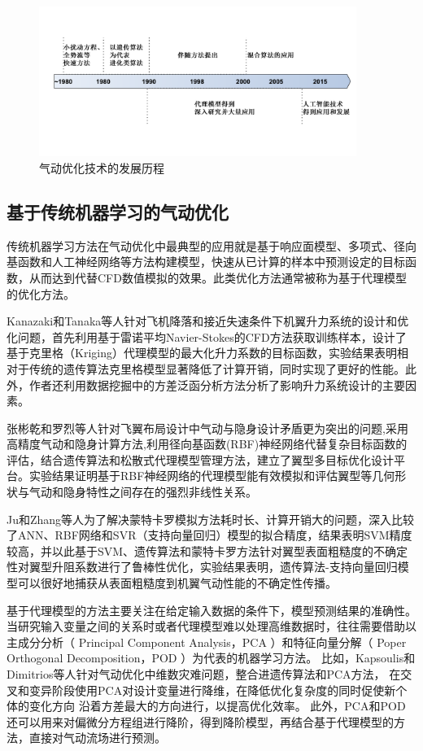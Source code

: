 \begin{figure}[htp]
	\centering
	\includegraphics[width=0.92\textwidth]{figures/develop.pdf}
	\caption{气动优化技术的发展历程}
	\label{fig:1}
\end{figure}

\subsection{基于传统机器学习的气动优化}
传统机器学习方法在气动优化中最典型的应用就是基于响应面模型、多项式、径向基函数和人工神经网络等方法构建模型，快速从已计算的样本中预测设定的目标函数，从而达到代替CFD数值模拟的效果。此类优化方法通常被称为基于代理模型的优化方法。

Kanazaki和Tanaka等人\cite{Kanazaki2007Multi}针对飞机降落和接近失速条件下机翼升力系统的设计和优化问题，首先利用基于雷诺平均Navier-Stokes的CFD方法获取训练样本，设计了基于克里格（Kriging）代理模型的最大化升力系数的目标函数，实验结果表明相对于传统的遗传算法克里格模型显著降低了计算开销，同时实现了更好的性能。此外，作者还利用数据挖掘中的方差泛函分析方法分析了影响升力系统设计的主要因素。

张彬乾和罗烈等人\cite{张罗}针对飞翼布局设计中气动与隐身设计矛盾更为突出的问题,采用高精度气动和隐身计算方法,利用径向基函数(RBF)神经网络代替复杂目标函数的评估，结合遗传算法和松散式代理模型管理方法，建立了翼型多目标优化设计平台。实验结果证明基于RBF神经网络的代理模型能有效模拟和评估翼型等几何形状与气动和隐身特性之间存在的强烈非线性关系。

Ju和Zhang等人\cite{Ame}为了解决蒙特卡罗模拟方法耗时长、计算开销大的问题，深入比较了ANN、RBF网络和SVR（支持向量回归）模型的拟合精度，结果表明SVM精度较高，并以此基于SVM、遗传算法和蒙特卡罗方法针对翼型表面粗糙度的不确定性对翼型升阻系数进行了鲁棒性优化，实验结果表明，遗传算法-支持向量回归模型可以很好地捕获从表面粗糙度到机翼气动性能的不确定性传播。

基于代理模型的方法主要关注在给定输入数据的条件下，模型预测结果的准确性。
当研究输入变量之间的关系时或者代理模型难以处理高维数据时，往往需要借助以主成分分析（ Principal Component Analysis，PCA ）和特征向量分解（ Poper Orthogonal Decomposition，POD ）为代表的机器学习方法。
比如，Kapsoulis和Dimitrios等人\cite{Kapsoulis2018Evolutionary}针对气动优化中维数灾难问题，整合进遗传算法和PCA方法，
在交叉和变异阶段使用PCA对设计变量进行降维，在降低优化复杂度的同时促使新个体的变化方向
沿着方差最大的方向进行，以提高优化效率。
此外，PCA和POD还可以用来对偏微分方程组进行降阶，得到降阶模型，再结合基于代理模型的方法，直接对气动流场进行预测。


